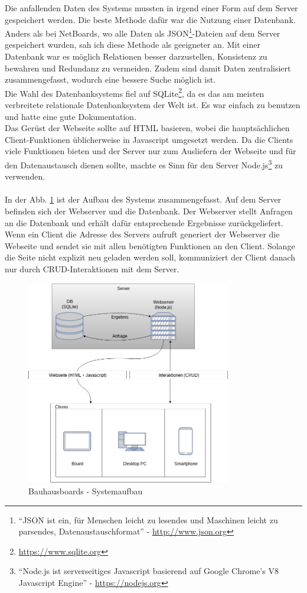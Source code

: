 Die anfallenden Daten des Systems mussten in irgend einer Form auf dem Server gespeichert werden. Die beste Methode dafür war die Nutzung einer Datenbank. Anders als bei NetBoards, wo alle Daten als JSON\footnote{``JSON ist ein, für Menschen leicht zu lesendes und Maschinen leicht zu parsendes, Datenaustauschformat'' - \url{http://www.json.org}}-Dateien auf dem Server gespeichert wurden, sah ich diese Methode als geeigneter an. Mit einer Datenbank war es möglich Relationen besser darzustellen, Konsistenz zu bewahren und Redundanz zu vermeiden. Zudem sind damit Daten zentralisiert zusammengefasst, wodurch eine bessere Suche möglich ist.
\\
Die Wahl des Datenbanksystems fiel auf SQLite\footnote{\url{https://www.sqlite.org}}, da es das am meisten verbreitete relationale Datenbanksystem der Welt ist. Es war einfach zu benutzen und hatte eine gute Dokumentation.
\\
Das Gerüst der Webseite sollte auf HTML basieren, wobei die hauptsächlichen Client-Funktionen üblicherweise in Javascript umgesetzt werden. Da die Clients viele Funktionen bieten und der Server nur zum Ausliefern der Webseite und für den Datenaustausch dienen sollte, machte es Sinn für den Server Node.js\footnote{``Node.js ist serverseitiges Javascript basierend auf Google Chrome's V8 Javascript Engine'' - \url{https://nodejs.org}} zu verwenden.
\\
\\
In der Abb. \ref{img:Systemaufbau} ist der Aufbau des Systems zusammengefasst. Auf dem Server befinden sich der Webserver und die Datenbank. Der Webserver stellt Anfragen an die Datenbank und erhält dafür entsprechende Ergebnisse zurückgeliefert.
\\
Wenn ein Client die Adresse des Servers aufruft generiert der Webserver die Webseite und sendet sie mit allen benötigten Funktionen an den Client. Solange die Seite nicht explizit neu geladen werden soll, kommuniziert der Client danach nur durch CRUD-Interaktionen mit dem Server.
\\
\begin{figure}[h!]
  \centering
    \includegraphics[width=0.8\textwidth]{./img/Systemaufbau.png}
  \caption{Bauhausboards - Systemaufbau}
  \label{img:Systemaufbau}
\end{figure}

